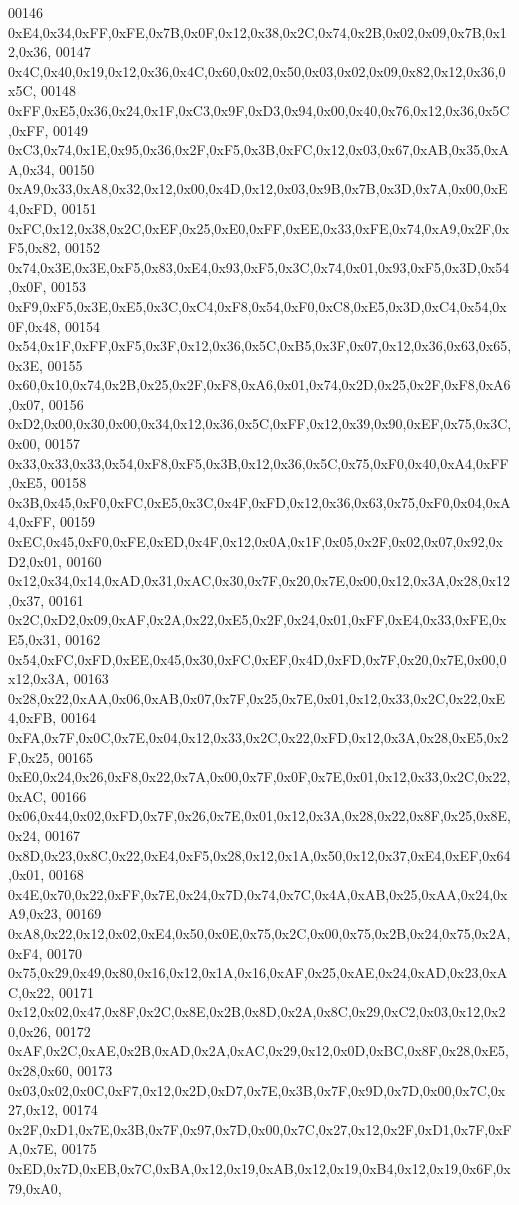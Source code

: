 \begin{DoxyCode}
00146 0xE4,0x34,0xFF,0xFE,0x7B,0x0F,0x12,0x38,0x2C,0x74,0x2B,0x02,0x09,0x7B,0x12,0x36,
00147 0x4C,0x40,0x19,0x12,0x36,0x4C,0x60,0x02,0x50,0x03,0x02,0x09,0x82,0x12,0x36,0x5C,
00148 0xFF,0xE5,0x36,0x24,0x1F,0xC3,0x9F,0xD3,0x94,0x00,0x40,0x76,0x12,0x36,0x5C,0xFF,
00149 0xC3,0x74,0x1E,0x95,0x36,0x2F,0xF5,0x3B,0xFC,0x12,0x03,0x67,0xAB,0x35,0xAA,0x34,
00150 0xA9,0x33,0xA8,0x32,0x12,0x00,0x4D,0x12,0x03,0x9B,0x7B,0x3D,0x7A,0x00,0xE4,0xFD,
00151 0xFC,0x12,0x38,0x2C,0xEF,0x25,0xE0,0xFF,0xEE,0x33,0xFE,0x74,0xA9,0x2F,0xF5,0x82,
00152 0x74,0x3E,0x3E,0xF5,0x83,0xE4,0x93,0xF5,0x3C,0x74,0x01,0x93,0xF5,0x3D,0x54,0x0F,
00153 0xF9,0xF5,0x3E,0xE5,0x3C,0xC4,0xF8,0x54,0xF0,0xC8,0xE5,0x3D,0xC4,0x54,0x0F,0x48,
00154 0x54,0x1F,0xFF,0xF5,0x3F,0x12,0x36,0x5C,0xB5,0x3F,0x07,0x12,0x36,0x63,0x65,0x3E,
00155 0x60,0x10,0x74,0x2B,0x25,0x2F,0xF8,0xA6,0x01,0x74,0x2D,0x25,0x2F,0xF8,0xA6,0x07,
00156 0xD2,0x00,0x30,0x00,0x34,0x12,0x36,0x5C,0xFF,0x12,0x39,0x90,0xEF,0x75,0x3C,0x00,
00157 0x33,0x33,0x33,0x54,0xF8,0xF5,0x3B,0x12,0x36,0x5C,0x75,0xF0,0x40,0xA4,0xFF,0xE5,
00158 0x3B,0x45,0xF0,0xFC,0xE5,0x3C,0x4F,0xFD,0x12,0x36,0x63,0x75,0xF0,0x04,0xA4,0xFF,
00159 0xEC,0x45,0xF0,0xFE,0xED,0x4F,0x12,0x0A,0x1F,0x05,0x2F,0x02,0x07,0x92,0xD2,0x01,
00160 0x12,0x34,0x14,0xAD,0x31,0xAC,0x30,0x7F,0x20,0x7E,0x00,0x12,0x3A,0x28,0x12,0x37,
00161 0x2C,0xD2,0x09,0xAF,0x2A,0x22,0xE5,0x2F,0x24,0x01,0xFF,0xE4,0x33,0xFE,0xE5,0x31,
00162 0x54,0xFC,0xFD,0xEE,0x45,0x30,0xFC,0xEF,0x4D,0xFD,0x7F,0x20,0x7E,0x00,0x12,0x3A,
00163 0x28,0x22,0xAA,0x06,0xAB,0x07,0x7F,0x25,0x7E,0x01,0x12,0x33,0x2C,0x22,0xE4,0xFB,
00164 0xFA,0x7F,0x0C,0x7E,0x04,0x12,0x33,0x2C,0x22,0xFD,0x12,0x3A,0x28,0xE5,0x2F,0x25,
00165 0xE0,0x24,0x26,0xF8,0x22,0x7A,0x00,0x7F,0x0F,0x7E,0x01,0x12,0x33,0x2C,0x22,0xAC,
00166 0x06,0x44,0x02,0xFD,0x7F,0x26,0x7E,0x01,0x12,0x3A,0x28,0x22,0x8F,0x25,0x8E,0x24,
00167 0x8D,0x23,0x8C,0x22,0xE4,0xF5,0x28,0x12,0x1A,0x50,0x12,0x37,0xE4,0xEF,0x64,0x01,
00168 0x4E,0x70,0x22,0xFF,0x7E,0x24,0x7D,0x74,0x7C,0x4A,0xAB,0x25,0xAA,0x24,0xA9,0x23,
00169 0xA8,0x22,0x12,0x02,0xE4,0x50,0x0E,0x75,0x2C,0x00,0x75,0x2B,0x24,0x75,0x2A,0xF4,
00170 0x75,0x29,0x49,0x80,0x16,0x12,0x1A,0x16,0xAF,0x25,0xAE,0x24,0xAD,0x23,0xAC,0x22,
00171 0x12,0x02,0x47,0x8F,0x2C,0x8E,0x2B,0x8D,0x2A,0x8C,0x29,0xC2,0x03,0x12,0x20,0x26,
00172 0xAF,0x2C,0xAE,0x2B,0xAD,0x2A,0xAC,0x29,0x12,0x0D,0xBC,0x8F,0x28,0xE5,0x28,0x60,
00173 0x03,0x02,0x0C,0xF7,0x12,0x2D,0xD7,0x7E,0x3B,0x7F,0x9D,0x7D,0x00,0x7C,0x27,0x12,
00174 0x2F,0xD1,0x7E,0x3B,0x7F,0x97,0x7D,0x00,0x7C,0x27,0x12,0x2F,0xD1,0x7F,0xFA,0x7E,
00175 0xED,0x7D,0xEB,0x7C,0xBA,0x12,0x19,0xAB,0x12,0x19,0xB4,0x12,0x19,0x6F,0x79,0xA0,

\end{DoxyCode}
